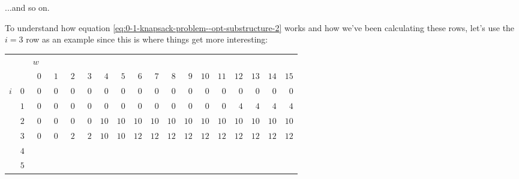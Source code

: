 
...and so on.

To understand how equation \eqref{eq:0-1-knapsack-problem--opt-substructure-2} works and how we've been calculating these rows, let's use the $i = 3$ row as an example since this is where things get more interesting:
\begin{center}
    \begin{tabular}{cr|rrrrrrrrrrrrrrrr|}
        {}
            &
            & \multicolumn{16}{l|}{$w$} \\
        {}
            &
            & $\phantom{0}0$ & $\phantom{0}1$ & $\phantom{0}2$ & $\phantom{0}3$
            & $\phantom{0}4$ & $\phantom{0}5$ & $\phantom{0}6$ & $\phantom{0}7$
            & $\phantom{0}8$ & $\phantom{0}9$
            & $10$ & $11$ & $12$ &$13$ & $14$ & $15$ \\ \hline
        $i$
            & $0$
            & $0$ & $0$ & $0$ & $0$ & $0$ & $0$ & $0$ & $0$
            & $0$ & $0$ & $0$ & $0$ & $0$ & $0$ & $0$ & $0$ \\
        {}
            & $1$
            & $0$ & $0$ & $0$ & $0$ & $0$ & $0$ & $0$ & $0$
            & $0$ & $0$ & $0$ & $0$ & $4$ & $4$ & $4$ & $4$ \\
        {}
            & $2$
            & $0$ & $0$ & $0$ & \cellcolor{red!30}$0$ & $10$
            & \cellcolor{red!30}$10$ & $10$ & $10$
            & $10$ & $10$ & $10$ & $10$ & $10$ & $10$ & $10$ & $10$ \\
        {}
            & $3$
            & $0$ & $0$ & $2$ & $2$ & $10$ & \cellcolor{blue!30}$10$
            & $12$ & $12$
            & $12$ & $12$ & $12$ & $12$ & $12$ & $12$ & $12$ & $12$ \\
        {}
            & $4$
            & & & & & & & & & & & & & & & & \\
        {}
            & $5$
            & & & & & & & & & & & & & & & & \\ \hline
    \end{tabular}
\end{center}
\SkipAfterTable

